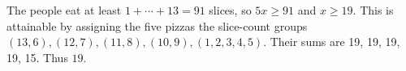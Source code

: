 The people eat at least $1+\cdots+13=91$ slices, so $5x\ge91$ and $x\ge19$. This is attainable by assigning the five pizzas the slice-count groups $(13,6),(12,7),(11,8),(10,9),(1,2,3,4,5)$. Their sums are 19, 19, 19, 19, 15. Thus $\boxed{19}$.
